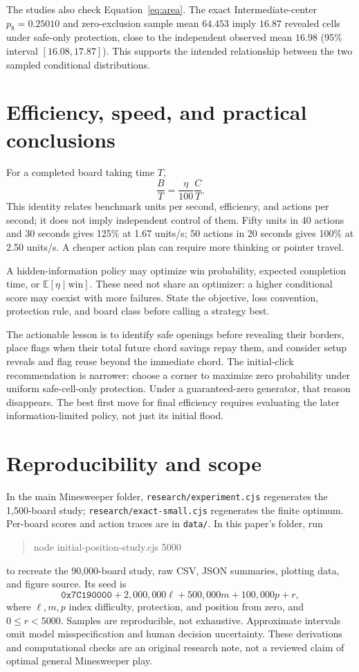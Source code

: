 \documentclass[11pt,letterpaper]{article}
\newcommand{\E}{\mathbb{E}}
\begin{document}
The studies also check Equation~\eqref{eq:area}. The exact Intermediate-center $p_8=0.25010$ and zero-exclusion sample mean $64.453$ imply $16.87$ revealed cells under safe-only protection, close to the independent observed mean $16.98$ (95\% interval $[16.08,17.87]$). This supports the intended relationship between the two sampled conditional distributions.

\section{Efficiency, speed, and practical conclusions}
For a completed board taking time $T$,
\begin{equation}
 \frac{B}{T}=\frac{\eta}{100}\frac{C}{T}.
\end{equation}
This identity relates benchmark units per second, efficiency, and actions per second; it does not imply independent control of them. Fifty units in 40 actions and 30 seconds gives 125\% at 1.67 units/s; 50 actions in 20 seconds gives 100\% at 2.50 units/s. A cheaper action plan can require more thinking or pointer travel.

A hidden-information policy may optimize win probability, expected completion time, or $\E[\eta\mid\mathrm{win}]$. These need not share an optimizer: a higher conditional score may coexist with more failures. State the objective, loss convention, protection rule, and board class before calling a strategy best.

The actionable lesson is to identify safe openings before revealing their borders, place flags when their total future chord savings repay them, and consider setup reveals and flag reuse beyond the immediate chord. The initial-click recommendation is narrower: choose a corner to maximize zero probability under uniform safe-cell-only protection. Under a guaranteed-zero generator, that reason disappears. The best first move for final efficiency requires evaluating the later information-limited policy, not just its initial flood.

\section{Reproducibility and scope}
In the main Minesweeper folder, \texttt{research/experiment.cjs} regenerates the 1,500-board study; \texttt{research/exact-small.cjs} regenerates the finite optimum. Per-board scores and action traces are in \texttt{data/}. In this paper's folder, run
\begin{quote}\small\ttfamily
node initial-position-study.cjs 5000
\end{quote}
to recreate the 90,000-board study, raw CSV, JSON summaries, plotting data, and figure source. Its seed is
\[
\texttt{0x7C190000}+2{,}000{,}000\ell+500{,}000m+100{,}000p+r,
\]
where $\ell,m,p$ index difficulty, protection, and position from zero, and $0\leq r<5000$. Samples are reproducible, not exhaustive. Approximate intervals omit model misspecification and human decision uncertainty. These derivations and computational checks are an original research note, not a reviewed claim of optimal general Minesweeper play.
\end{document}
